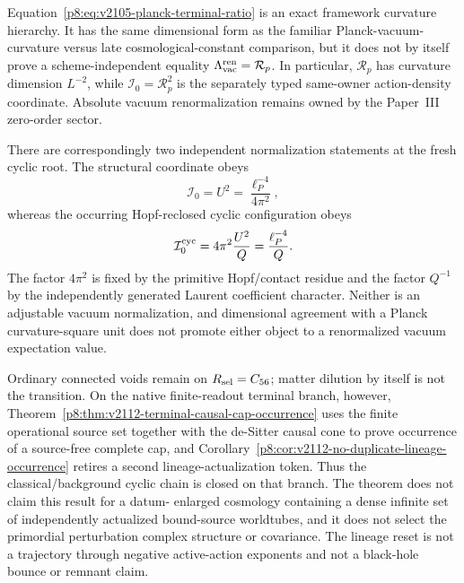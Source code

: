 \documentclass[12pt,a4paper]{article}
\begin{document}
\begin{remark}
\label{p8:rem:v2105-vacuum-curvature-firewall}
Equation~\eqref{p8:eq:v2105-planck-terminal-ratio} is an exact framework
curvature hierarchy.  It has the same dimensional form as the familiar
Planck-vacuum-curvature versus late cosmological-constant comparison, but it
does not by itself prove a scheme-independent equality
\(\Lambda_{\rm vac}^{\rm ren}=\mathcal R_p\).  In particular,
\(\mathcal R_p\) has curvature dimension \(L^{-2}\), while
\(\mathcal I_0=\mathcal R_p^2\) is the separately typed same-owner
action-density coordinate.  Absolute vacuum renormalization remains owned by
the Paper~III zero-order sector.

There are correspondingly two independent normalization statements at the
fresh cyclic root.  The structural coordinate obeys
\[
 \mathcal I_0=U^2=\frac{\ell_P^{-4}}{4\pi^2},
\]
whereas the occurring Hopf-reclosed cyclic configuration obeys
\[
 \mathcal I_0^{\rm cyc}=4\pi^2\frac{U^2}{Q}
 =\frac{\ell_P^{-4}}Q.
\]
The factor \(4\pi^2\) is fixed by the primitive Hopf/contact residue and the
factor \(Q^{-1}\) by the independently generated Laurent coefficient
character.  Neither is an adjustable vacuum normalization, and dimensional
agreement with a Planck curvature-square unit does not promote either object
to a renormalized vacuum expectation value.
\end{remark}

\begin{remark}
\label{p8:rem:detached-void-cap-extension}
Ordinary connected voids remain on \(R_{\rm sel}=C_{56}\); matter dilution
by itself is not the transition.  On the native finite-readout terminal
branch, however, Theorem~\ref{p8:thm:v2112-terminal-causal-cap-occurrence}
uses the finite operational source set together with the de-Sitter causal cone
to prove occurrence of a source-free complete cap, and
Corollary~\ref{p8:cor:v2112-no-duplicate-lineage-occurrence} retires a second
lineage-actualization token.  Thus the classical/background cyclic chain is
closed on that branch.  The theorem does not claim this result for a datum-
enlarged cosmology containing a dense infinite set of independently actualized
bound-source worldtubes, and it does not select the primordial perturbation
complex structure or covariance.  The lineage reset is not a trajectory
through negative active-action exponents and not a black-hole bounce or remnant
claim.
\end{remark}
\end{document}
